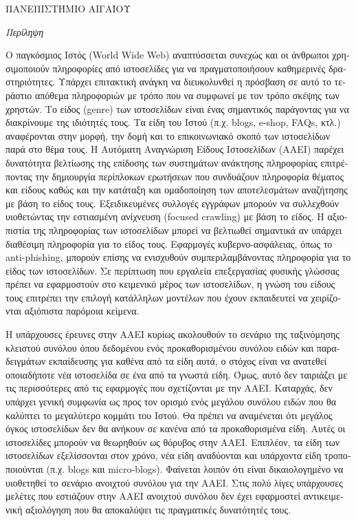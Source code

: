 \documentclass[
    12pt, %
    english, %
    singlespacing, %
    liststotoc, %
    headsepline, %
]{DoctoralThesis} %
\begin{document}
\begin{abstractGR}

\begin{center}
{\normalsize \MakeUppercase{\textgreek{Πανεπιστήμιο Αιγαίου}} \par}
\bigskip
{\huge\textit{ \textgreek{Περίληψη} } \par}
\bigskip
\end{center}

\begin{greek}
Ο παγκόσμιος Ιστός (World Wide Web) αναπτύσσεται συνεχώς και οι άνθρωποι χρησιμοποιούν πληροφορίες από ιστοσελίδες για να πραγματοποιήσουν καθημερινές δραστηριότητες. Υπάρχει επιτακτική ανάγκη να διευκολυνθεί η πρόσβαση σε αυτό το τεράστιο απόθεμα πληροφοριών με τρόπο που να συμφωνεί με τον τρόπο σκέψης των χρηστών.  Το είδος (genre) των ιστοσελίδων είναι ένας σημαντικός παράγοντας για να διακρίνουμε της ιδιότητές τους. Τα είδη του Ιστού (π.χ. blogs, e-shop, FAQs, κτλ.) αναφέρονται στην μορφή, την δομή και το επικοινωνιακό σκοπό των ιστοσελίδων παρά στο θέμα τους. Η Αυτόματη Αναγνώριση Είδους Ιστοσελίδων (ΑΑΕΙ) παρέχει δυνατότητα βελτίωσης της επίδοσης των συστημάτων ανάκτησης πληροφορίας επιτρέποντας την δημιουργία περίπλοκων ερωτήσεων που συνδυάζουν πληροφορία θέματος και είδους καθώς και την κατάταξη και ομαδοποίηση των αποτελεσμάτων αναζήτησης με βάση το είδος τους. Εξειδικευμένες συλλογές εγγράφων μπορούν να συλλεχθούν υιοθετώντας την εστιασμένη ανίχνευση (focused crawling) με βάση το είδος. Η αξιοπιστία της πληροφορίας των ιστοσελίδων μπορεί να βελτιωθεί σημαντικά αν υπάρχει διαθέσιμη πληροφορία για το είδος τους. Εφαρμογές κυβερνο-ασφάλειας, όπως το anti-phishing, μπορούν επίσης να ενισχυθούν συμπεριλαμβάνοντας πληροφορία για το είδος των ιστοσελίδων. Σε περίπτωση που εργαλεία επεξεργασίας φυσικής γλώσσας πρέπει να εφαρμοστούν στο κειμενικό μέρος των ιστοσελίδων, η γνώση του είδους τους επιτρέπει την επιλογή κατάλληλων μοντέλων που έχουν εκπαιδευτεί να χειρίζονται αξιόπιστα παρόμοια κείμενα.

Η υπάρχουσες έρευνες στην ΑΑΕΙ κυρίως ακολουθούν το σενάριο της ταξινόμησης κλειστού συνόλου όπου δεδομένου ενός προκαθορισμένου συνόλου ειδών και παραδειγμάτων εκπαίδευσης για καθένα από τα είδη αυτά, ο στόχος είναι να ανατεθεί οποιαδήποτε νέα ιστοσελίδα σε ένα από τα γνωστά είδη. Όμως, αυτό δεν ταιριάζει με τις περισσότερες από τις εφαρμογές που σχετίζονται με την ΑΑΕΙ. Καταρχάς, δεν υπάρχει γενική συμφωνία ως προς τον ορισμό ενός μεγάλου συνόλου ειδών που θα καλύπτει το μεγαλύτερο κομμάτι του Ιστού. Θα πρέπει να αναμένεται ότι μεγάλος όγκος ιστοσελίδων δεν θα ανήκουν σε κανένα από τα προκαθορισμένα είδη. Αυτές οι ιστοσελίδες μπορούν να θεωρηθούν ως θόρυβος στην ΑΑΕΙ. Επιπλέον, τα είδη των ιστοσελίδων εξελίσσονται στον χρόνο, νέα είδη αναδύονται και υπάρχοντα είδη τροποποιούνται (π.χ. blogs και micro-blogs). Φαίνεται λοιπόν ότι είναι δικαιολογημένο να υιοθετηθεί το σενάριο ανοιχτού συνόλου για την ΑΑΕΙ. Στις πολύ λίγες υπάρχουσες μελέτες που εστιάζουν στην ΑΑΕΙ ανοιχτού συνόλου δεν έχει εφαρμοστεί αντικειμενική αξιολόγηση που θα αποκαλύψει τις πραγματικές δυνατότητές τους.


\end{greek}
\end{abstractGR}
\end{document}
